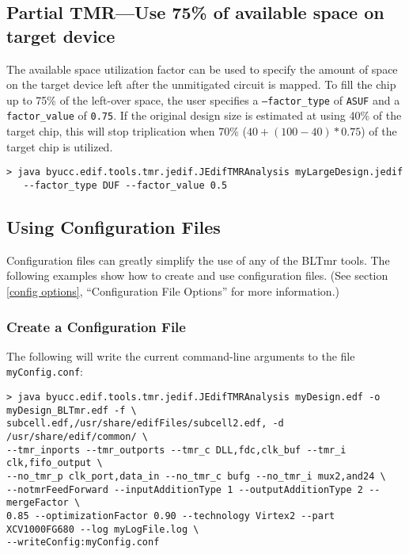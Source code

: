 \subsection{Partial TMR---Use 75\% of available space on target device}
The available space utilization factor can be used to specify the amount of
space on the target device left after the unmitigated circuit is mapped. To
fill the chip up to 75\% of the left-over space, the user specifies a 
\texttt{--factor\_type} of \texttt{ASUF} and a \texttt{factor\_value} of 
\texttt{0.75}. If the original design size is estimated at using 40\% of the
target chip, this will stop triplication when 70\% ($40 + (100-40)*0.75$) of
the target chip is utilized.

\begin{verbatim}
> java byucc.edif.tools.tmr.jedif.JEdifTMRAnalysis myLargeDesign.jedif 
   --factor_type DUF --factor_value 0.5
\end{verbatim}


\subsection{Using Configuration Files}
\label{using config}
Configuration files can greatly simplify the use of any of the
 BLTmr tools.  The following examples show how to create and use
 configuration files. (See section \ref{config options},
 ``Configuration File Options'' for more information.)

\subsubsection{Create a Configuration File}
The following will write the current command-line arguments to the file
\texttt{myConfig.conf}:

\begin{verbatim}
> java byucc.edif.tools.tmr.jedif.JEdifTMRAnalysis myDesign.edf -o myDesign_BLTmr.edf -f \ 
subcell.edf,/usr/share/edifFiles/subcell2.edf, -d /usr/share/edif/common/ \ 
--tmr_inports --tmr_outports --tmr_c DLL,fdc,clk_buf --tmr_i clk,fifo_output \ 
--no_tmr_p clk_port,data_in --no_tmr_c bufg --no_tmr_i mux2,and24 \ 
--notmrFeedForward --inputAdditionType 1 --outputAdditionType 2 --mergeFactor \ 
0.85 --optimizationFactor 0.90 --technology Virtex2 --part XCV1000FG680 --log myLogFile.log \
--writeConfig:myConfig.conf
\end{verbatim}

